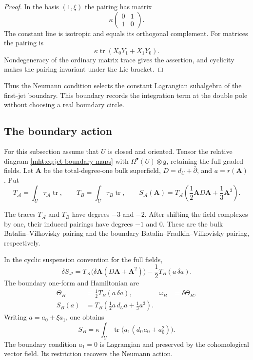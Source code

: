 \begin{proof}
In the basis $(1,\xi)$ the pairing has matrix
\[
 \kappa\begin{pmatrix}0&1\\1&0\end{pmatrix}.
\]
The constant line is isotropic and equals its orthogonal complement.
For matrices the pairing is
\[
 \kappa\operatorname{tr}(X_0Y_1+X_1Y_0).
\]
Nondegeneracy of the ordinary matrix trace gives the assertion, and
cyclicity makes the pairing invariant under the Lie bracket.
\end{proof}

Thus the Neumann condition selects the constant Lagrangian subalgebra
of the first-jet boundary. This boundary records the integration term
at the double pole without choosing a real boundary circle.

\subsection{The boundary action}

For this subsection assume that $U$ is closed and oriented. Tensor the
relative diagram \eqref{mht:eq:jet-boundary-maps} with
$\Omega^\bullet(U)\otimes\mathfrak g$, retaining the full graded
fields. Let $\mathbf A$ be the total-degree-one bulk superfield,
$D=d_U+\bar\partial$, and $a=r(\mathbf A)$. Put
\[
 T_{\mathcal A}=\int_U\tau_{\mathcal A}\operatorname{tr},\qquad
 T_B=\int_U\tau_B\operatorname{tr},\qquad
 S_{\mathcal A}(\mathbf A)
 =T_{\mathcal A}\left(\frac12\mathbf A D\mathbf A
                                      +\frac13\mathbf A^3\right).
\]

The traces $T_{\mathcal A}$ and $T_B$ have degrees $-3$ and $-2$.
After shifting the field complexes by one, their induced pairings have
degrees $-1$ and $0$. These are the bulk Batalin--Vilkovisky pairing
and the boundary Batalin--Fradkin--Vilkovisky pairing, respectively.

\begin{proposition}\label{mht:prop:polar-boundary-action}
In the cyclic suspension convention for the full fields,
\begin{equation}\label{mht:eq:polar-action-variation}
 \delta S_{\mathcal A}
 =T_{\mathcal A}\bigl(\delta\mathbf A
                     (D\mathbf A+\mathbf A^2)\bigr)
                         -\frac12T_B(a\,\delta a).
\end{equation}
The boundary one-form and Hamiltonian are
\begin{align}
 \Theta_B&=\frac12T_B(a\,\delta a),&
 \omega_B&=\delta\Theta_B,\label{mht:eq:polar-boundary-form}\\
 S_B(a)&=T_B\left(\frac12a\,d_Ua+\frac13a^3\right).
       \label{mht:eq:polar-boundary-hamiltonian}
\end{align}
Writing $a=a_0+\xi a_1$, one obtains
\begin{equation}\label{mht:eq:polar-bfv-bf}
 S_B=\kappa\int_U\operatorname{tr}
                            \bigl(a_1(d_Ua_0+a_0^2)\bigr).
\end{equation}
The boundary condition $a_1=0$ is Lagrangian and preserved by the
cohomological vector field. Its restriction recovers the Neumann
action.
\end{proposition}


